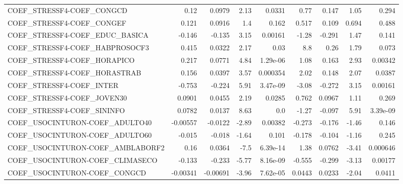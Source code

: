 \begin{tabular}{lrrrrrrrr}
COEF\_STRESSF4-COEF\_CONGCD              &        0.12 &       0.0979 &    2.13 &   0.0331 &       0.77 &       0.147 &         1.05 &         0.294 \\
COEF\_STRESSF4-COEF\_CONGEF              &       0.121 &       0.0916 &     1.4 &    0.162 &      0.517 &       0.109 &        0.694 &         0.488 \\
COEF\_STRESSF4-COEF\_EDUC\_BASICA         &      -0.146 &       -0.135 &    3.15 &  0.00161 &      -1.28 &      -0.291 &         1.47 &         0.141 \\
COEF\_STRESSF4-COEF\_HABPROSOCF3         &       0.415 &       0.0322 &    2.17 &     0.03 &        8.8 &        0.26 &         1.79 &         0.073 \\
COEF\_STRESSF4-COEF\_HORAPICO            &       0.217 &       0.0771 &    4.84 & 1.29e-06 &       1.08 &       0.163 &         2.93 &       0.00342 \\
COEF\_STRESSF4-COEF\_HORASTRAB           &       0.156 &       0.0397 &    3.57 & 0.000354 &       2.02 &       0.148 &         2.07 &        0.0387 \\
COEF\_STRESSF4-COEF\_INTER               &      -0.753 &       -0.224 &    5.91 & 3.47e-09 &      -3.08 &      -0.272 &         3.15 &       0.00161 \\
COEF\_STRESSF4-COEF\_JOVEN30             &      0.0901 &       0.0455 &    2.19 &   0.0285 &      0.762 &      0.0967 &         1.11 &         0.269 \\
COEF\_STRESSF4-COEF\_SININFO             &      0.0782 &       0.0137 &    8.63 &      0.0 &      -1.27 &      -0.097 &         5.91 &      3.39e-09 \\
COEF\_USOCINTURON-COEF\_ADULTO40         &    -0.00557 &      -0.0122 &   -2.89 &  0.00382 &     -0.273 &      -0.176 &        -1.46 &         0.146 \\
COEF\_USOCINTURON-COEF\_ADULTO60         &      -0.015 &       -0.018 &   -1.64 &    0.101 &     -0.178 &      -0.104 &        -1.16 &         0.245 \\
COEF\_USOCINTURON-COEF\_AMBLABORF2       &        0.16 &       0.0364 &    -7.5 & 6.39e-14 &       1.38 &      0.0762 &        -3.41 &      0.000646 \\
COEF\_USOCINTURON-COEF\_CLIMASECO        &      -0.133 &       -0.233 &   -5.77 & 8.16e-09 &     -0.555 &      -0.299 &        -3.13 &       0.00177 \\
COEF\_USOCINTURON-COEF\_CONGCD           &    -0.00341 &     -0.00691 &   -3.96 & 7.62e-05 &     0.0443 &      0.0233 &        -2.04 &        0.0411 \\

\end{tabular}
